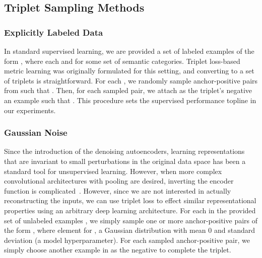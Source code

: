 \documentclass{article}
\begin{document}
\subsection{Triplet Sampling Methods}
\label{sec:sampling}

\subsubsection{Explicitly Labeled Data}
In standard supervised learning, we are provided a set of labeled examples of
the form , where each  and  for some set  of semantic
categories.  Triplet loss-based metric learning was originally formulated for
this setting, and converting  to a set of triplets is
straightforward.  For each , we randomly sample
anchor-positive pairs  from  such that .
Then, for each sampled pair, we attach as the triplet's negative an example
 such that . This procedure sets the
supervised performance topline in our experiments.

\subsubsection{Gaussian Noise}
Since the introduction of the denoising autoencoders, learning representations
that are invariant to small perturbations in the original data space has been a
standard tool for unsupervised learning.  However, when more complex
convolutional architectures with pooling are desired, inverting the encoder
function is complicated~\cite{masci2011stacked}.  However, since we are not
interested in actually reconstructing the inputs, we can use triplet loss to
effect similar representational properties using an arbitrary deep learning
architecture.  For each  in the provided set of
unlabeled examples , we simply sample one or more anchor-positive
pairs of the form , where element 
for , a Gaussian distribution with mean 0
and standard deviation  (a model hyperparameter).  For each sampled
anchor-positive pair, we simply choose another example in  as the negative to
complete the triplet.
\end{document}
